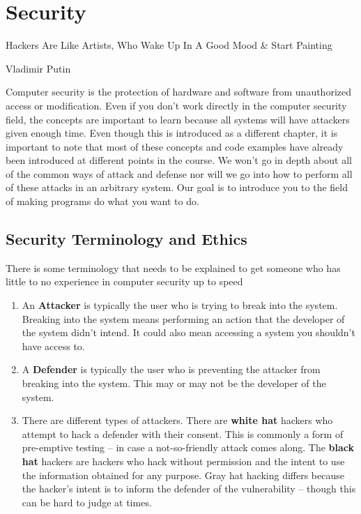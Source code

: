 \chapter{Security}

\epigraph{Hackers Are Like Artists, Who Wake Up In A Good Mood \& Start Painting}{Vladimir Putin}

Computer security is the protection of hardware and software from unauthorized access or modification.
Even if you don't work directly in the computer security field, the concepts are important to learn because all systems will have attackers given enough time.
Even though this is introduced as a different chapter, it is important to note that most of these concepts and code examples have already been introduced at different points in the course.
We won't go in depth about all of the common ways of attack and defense nor will we go into how to perform all of these attacks in an arbitrary system.
Our goal is to introduce you to the field of making programs do what you want to do.

\section{Security Terminology and Ethics}

There is some terminology that needs to be explained to get someone who has little to no experience in computer security up to speed

\begin{enumerate}
\item An \textbf{Attacker} is typically the user who is trying to break into the system. Breaking into the system means performing an action that the developer of the system didn't intend. It could also mean accessing a system you shouldn't have access to.
\item A \textbf{Defender} is typically the user who is preventing the attacker from breaking into the system. This may or may not be the developer of the system.
\item There are different types of attackers. There are \textbf{white hat} hackers who attempt to hack a defender with their consent. This is commonly a form of pre-emptive testing -- in case a not-so-friendly attack comes along. The \textbf{black hat} hackers are hackers who hack without permission and the intent to use the information obtained for any purpose. Gray hat hacking differs because the hacker's intent is to inform the defender of the vulnerability -- though this can be hard to judge at times.
\end{enumerate}


